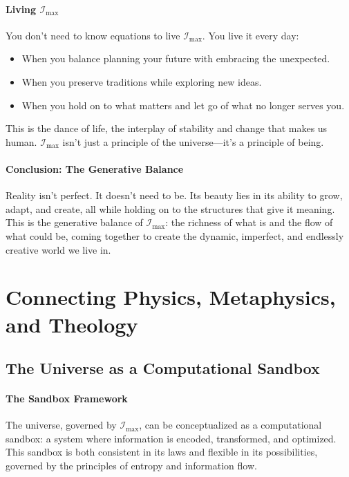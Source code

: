 \documentclass[12pt]{article}
\begin{document}
\paragraph{Living \(\mathcal{I}_{\text{max}}\)}
You don’t need to know equations to live \(\mathcal{I}_{\text{max}}\). You live it every day:
\begin{itemize}
    \item When you balance planning your future with embracing the unexpected.
    \item When you preserve traditions while exploring new ideas.
    \item When you hold on to what matters and let go of what no longer serves you.
\end{itemize}
This is the dance of life, the interplay of stability and change that makes us human. \(\mathcal{I}_{\text{max}}\) isn’t just a principle of the universe—it’s a principle of being.

\paragraph{Conclusion: The Generative Balance}
Reality isn’t perfect. It doesn’t need to be. Its beauty lies in its ability to grow, adapt, and create, all while holding on to the structures that give it meaning. This is the generative balance of \(\mathcal{I}_{\text{max}}\): the richness of what is and the flow of what could be, coming together to create the dynamic, imperfect, and endlessly creative world we live in.


\section{Connecting Physics, Metaphysics, and Theology}

\subsection{The Universe as a Computational Sandbox}

\paragraph{The Sandbox Framework}
The universe, governed by \(\mathcal{I}_{\text{max}}\), can be conceptualized as a computational sandbox: a system where information is encoded, transformed, and optimized. This sandbox is both consistent in its laws and flexible in its possibilities, governed by the principles of entropy and information flow.
\end{document}
